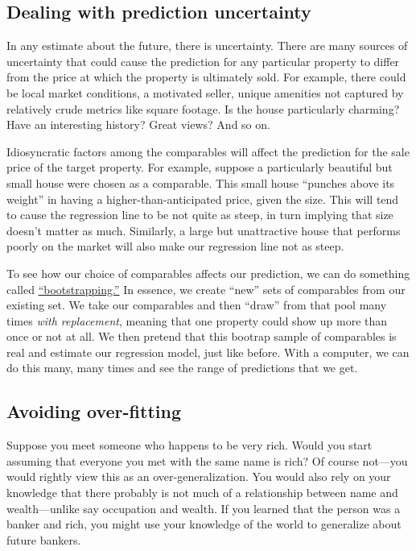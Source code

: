 \documentclass[
12pt, %
letterpaper, %
oneside, %
headinclude,footinclude, %
BCOR5mm, %
]{scrartcl}
\begin{document}
\begin{itemize}
  
\end{itemize}

\subsection{Dealing with prediction uncertainty}  \label{sec:bootstrapping} 
In any estimate about the future, there is uncertainty.
There are many sources of uncertainty that could cause the prediction for any particular property to differ from the price at which the property is ultimately sold.
For example, there could be local market conditions, a motivated seller, unique amenities not captured by relatively crude metrics like square footage. Is the house particularly charming? Have an interesting history? Great views? And so on. 

Idiosyncratic factors among the comparables will affect the prediction for the sale price of the target property.
For example, suppose a particularly beautiful but small house were chosen as a comparable.
This small house ``punches above its weight'' in having a higher-than-anticipated price, given the size.
This will tend to cause the regression line to be not quite as steep, in turn implying that size doesn't matter as much.
Similarly, a large but unattractive house that performs poorly on the market will also make our regression line not as steep.

To see how our choice of comparables affects our prediction, we can do something called \href{https://en.wikipedia.org/wiki/Bootstrapping_(statistics)}{``bootstrapping.''}
In essence, we create ``new'' sets of comparables from our existing set.
We take our comparables and then ``draw'' from that pool many times \emph{with replacement}, meaning that one property could show up more than once or not at all.
We then pretend that this bootrap sample of comparables is real and estimate our regression model, just like before.
With a computer, we can do this many, many times and see the range of predictions that we get. 

\subsection{Avoiding over-fitting} \label{sec:regularization}
Suppose you meet someone who happens to be very rich.
Would you start assuming that everyone you met with the same name is rich?
Of course not---you would rightly view this as an over-generalization.
You would also rely on your knowledge that there probably is not much of a relationship between name and wealth---unlike say occupation and wealth.
If you learned that the person was a banker and rich, you might use your knowledge of the world to generalize about future bankers.
\end{document}
